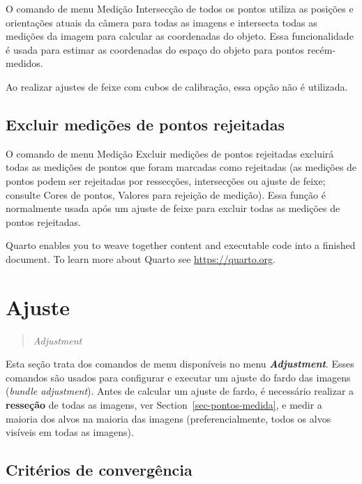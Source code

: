 \documentclass[
  12pt,
  letterpaper,
  DIV=11,
  numbers=noendperiod]{scrreprt}
\begin{document}
O comando de menu Medição \textbar{} Intersecção de todos os pontos
utiliza as posições e orientações atuais da câmera para todas as imagens
e intersecta todas as medições da imagem para calcular as coordenadas do
objeto. Essa funcionalidade é usada para estimar as coordenadas do
espaço do objeto para pontos recém-medidos.

Ao realizar ajustes de feixe com cubos de calibração, essa opção não é
utilizada.

\subsection{Excluir medições de pontos
rejeitadas}\label{excluir-mediuxe7uxf5es-de-pontos-rejeitadas}

O comando de menu Medição \textbar{} Excluir medições de pontos
rejeitadas excluirá todas as medições de pontos que foram marcadas como
rejeitadas (as medições de pontos podem ser rejeitadas por ressecções,
intersecções ou ajuste de feixe; consulte Cores de pontos, Valores para
rejeição de medição). Essa função é normalmente usada após um ajuste de
feixe para excluir todas as medições de pontos rejeitadas.

Quarto enables you to weave together content and executable code into a
finished document. To learn more about Quarto see
\url{https://quarto.org}.

\section{\texorpdfstring{\textbf{Ajuste}}{Ajuste}}\label{ajuste-1}

\begin{quote}
\emph{Adjustment}
\end{quote}

Esta seção trata dos comandos de menu disponíveis no menu
\textbf{\emph{Adjustment}}. Esses comandos são usados para configurar e
executar um ajuste do fardo das imagens (\emph{bundle adjustment}).
Antes de calcular um ajuste de fardo, é necessário realizar a
\textbf{resseção} de todas as imagens, ver
Section~\ref{sec-pontos-medida}, e medir a maioria dos alvos na maioria
das imagens (preferencialmente, todos os alvos visíveis em todas as
imagens).

\subsection{Critérios de
convergência}\label{crituxe9rios-de-converguxeancia}
\end{document}
